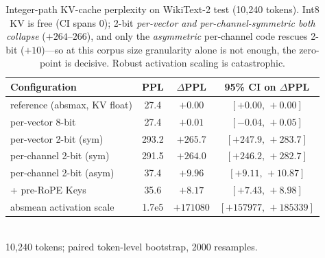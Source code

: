 \begin{table}[t]\centering\small
\caption{Integer-path KV-cache perplexity on WikiText-2 test (10{,}240 tokens). Int8
KV is free (CI spans 0); 2-bit \emph{per-vector and per-channel-symmetric both
collapse} ($+264$--$266$), and only the \emph{asymmetric} per-channel code rescues
2-bit ($+10$)---so at this corpus size granularity alone is not enough, the
zero-point is decisive. Robust activation scaling is catastrophic.}
\label{tab:wiki}
\begin{tabular}{lccc}
\toprule
Configuration & PPL & $\Delta$PPL & 95\% CI on $\Delta$PPL\\
\midrule
reference (absmax, KV float) & 27.4 & $+0.00$ & $[+0.00,\,+0.00]$\\
per-vector 8-bit & 27.4 & $+0.01$ & $[-0.04,\,+0.05]$\\
per-vector 2-bit (sym) & 293.2 & $+265.7$ & $[+247.9,\,+283.7]$\\
per-channel 2-bit (sym) & 291.5 & $+264.0$ & $[+246.2,\,+282.7]$\\
per-channel 2-bit (asym) & 37.4 & $\mathbf{+9.96}$ & $[+9.11,\,+10.87]$\\
\quad + pre-RoPE Keys & 35.6 & $+8.17$ & $[+7.43,\,+8.98]$\\
absmean activation scale & 1.7e5 & $+171080$ & $[+157977,\,+185339]$\\
\bottomrule
\end{tabular}
\\[2pt]{\footnotesize 10{,}240 tokens; paired token-level bootstrap, 2000 resamples.}
\end{table}
